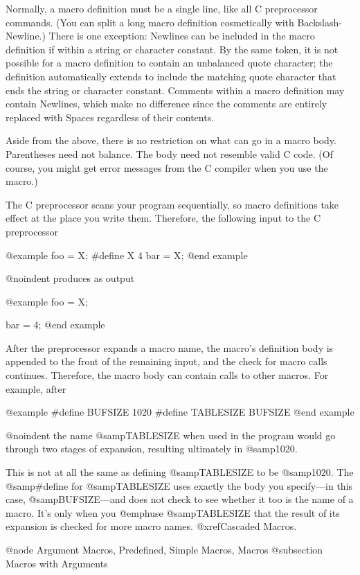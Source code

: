 {Normally, a macro definition must be a single line, like all C preprocessor
commands.  (You can split a long macro definition cosmetically with
Backslash-Newline.)  There is one exception: Newlines can be included in
the macro definition if within a string or character constant.  By the same
token, it is not possible for a macro definition to contain an unbalanced
quote character; the definition automatically extends to include the
matching quote character that ends the string or character constant.
Comments within a macro definition may contain Newlines, which make no
difference since the comments are entirely replaced with Spaces regardless
of their contents.

Aside from the above, there is no restriction on what can go in a macro
body.  Parentheses need not balance.  The body need not resemble valid C
code.  (Of course, you might get error messages from the C compiler when
you use the macro.)

The C preprocessor scans your program sequentially, so macro definitions
take effect at the place you write them.  Therefore, the following input to
the C preprocessor

@example
foo = X;
#define X 4
bar = X;
@end example

@noindent
produces as output

@example
foo = X;

bar = 4;
@end example

After the preprocessor expands a macro name, the macro's definition body is
appended to the front of the remaining input, and the check for macro calls
continues.  Therefore, the macro body can contain calls to other macros.
For example, after

@example
#define BUFSIZE 1020
#define TABLESIZE BUFSIZE
@end example

@noindent
the name @samp{TABLESIZE} when used in the program would go through two
stages of expansion, resulting ultimately in @samp{1020}.

This is not at all the same as defining @samp{TABLESIZE} to be @samp{1020}.
The @samp{#define} for @samp{TABLESIZE} uses exactly the body you
specify---in this case, @samp{BUFSIZE}---and does not check to see whether
it too is the name of a macro.  It's only when you @emph{use} @samp{TABLESIZE}
that the result of its expansion is checked for more macro names.
@xref{Cascaded Macros}.

@node Argument Macros, Predefined, Simple Macros, Macros
@subsection Macros with Arguments

}
